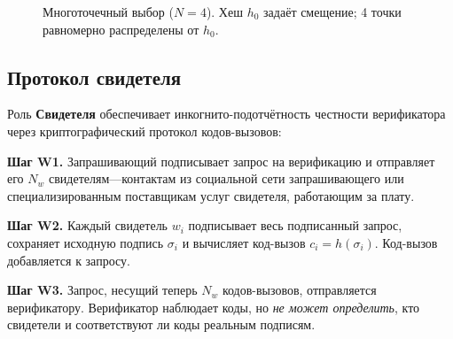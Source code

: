 \documentclass[11pt,a4paper,twocolumn]{article}
\begin{document}
\begin{figure}[ht]
\centering
{}
\caption{Многоточечный выбор ($N{=}4$). Хеш $h_0$ задаёт смещение; 4 точки равномерно распределены от $h_0$.}
\label{fig:multipoint}
\end{figure}

\subsection{Протокол свидетеля}

Роль \textbf{Свидетеля} обеспечивает инкогнито-подотчётность честности верификатора через криптографический протокол кодов-вызовов:

\textbf{Шаг W1.} Запрашивающий подписывает запрос на верификацию и отправляет его $N_w$ свидетелям---контактам из социальной сети запрашивающего или специализированным поставщикам услуг свидетеля, работающим за плату.

\textbf{Шаг W2.} Каждый свидетель $w_i$ подписывает весь подписанный запрос, сохраняет исходную подпись $\sigma_i$ и вычисляет код-вызов $c_i = h(\sigma_i)$. Код-вызов добавляется к запросу.

\textbf{Шаг W3.} Запрос, несущий теперь $N_w$ кодов-вызовов, отправляется верификатору. Верификатор наблюдает коды, но \emph{не может определить}, кто свидетели и соответствуют ли коды реальным подписям.
\end{document}
